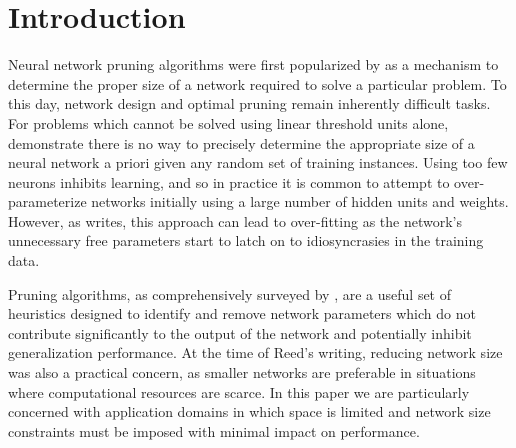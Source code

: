 \section{Introduction}
Neural network pruning algorithms were first popularized by \cite{sietsma1988neural} as a mechanism to determine the proper size of a network required to solve a particular problem. To this day, network design and optimal pruning remain inherently difficult tasks. For problems which cannot be solved using linear threshold units alone, \cite{baum1989size} demonstrate there is no way to precisely determine the appropriate size of a neural network a priori given any random set of training instances. Using too few neurons inhibits learning, and so in practice it is common to attempt to over-parameterize networks initially using a large number of hidden units and weights. However, as \cite{chauvin1990generalization} writes, this approach can lead to over-fitting as the network's unnecessary free parameters start to latch on to idiosyncrasies in the training data. 


Pruning algorithms, as comprehensively surveyed by \cite{reed1993pruning}, are a useful set of heuristics designed to identify and remove network parameters which do not contribute significantly to the output of the network and potentially inhibit generalization performance. At the time of Reed's writing, reducing network size was also a practical concern, as smaller networks are preferable in situations where computational resources are scarce. In this paper we are particularly concerned with application domains in which space is limited and network size constraints must be imposed with minimal impact on performance.